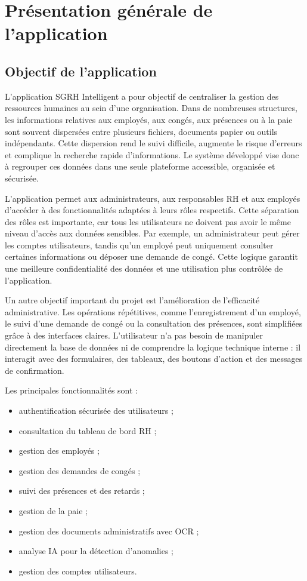 \documentclass[12pt,a4paper]{report}
\begin{document}
\chapter{Présentation générale de l'application}

\section{Objectif de l'application}

L'application SGRH Intelligent a pour objectif de centraliser la gestion des ressources humaines au sein d'une organisation. Dans de nombreuses structures, les informations relatives aux employés, aux congés, aux présences ou à la paie sont souvent dispersées entre plusieurs fichiers, documents papier ou outils indépendants. Cette dispersion rend le suivi difficile, augmente le risque d'erreurs et complique la recherche rapide d'informations. Le système développé vise donc à regrouper ces données dans une seule plateforme accessible, organisée et sécurisée.

L'application permet aux administrateurs, aux responsables RH et aux employés d'accéder à des fonctionnalités adaptées à leurs rôles respectifs. Cette séparation des rôles est importante, car tous les utilisateurs ne doivent pas avoir le même niveau d'accès aux données sensibles. Par exemple, un administrateur peut gérer les comptes utilisateurs, tandis qu'un employé peut uniquement consulter certaines informations ou déposer une demande de congé. Cette logique garantit une meilleure confidentialité des données et une utilisation plus contrôlée de l'application.

Un autre objectif important du projet est l'amélioration de l'efficacité administrative. Les opérations répétitives, comme l'enregistrement d'un employé, le suivi d'une demande de congé ou la consultation des présences, sont simplifiées grâce à des interfaces claires. L'utilisateur n'a pas besoin de manipuler directement la base de données ni de comprendre la logique technique interne : il interagit avec des formulaires, des tableaux, des boutons d'action et des messages de confirmation.

Les principales fonctionnalités sont :
\begin{itemize}
    \item authentification sécurisée des utilisateurs ;
    \item consultation du tableau de bord RH ;
    \item gestion des employés ;
    \item gestion des demandes de congés ;
    \item suivi des présences et des retards ;
    \item gestion de la paie ;
    \item gestion des documents administratifs avec OCR ;
    \item analyse IA pour la détection d'anomalies ;
    \item gestion des comptes utilisateurs.
\end{itemize}
\end{document}
